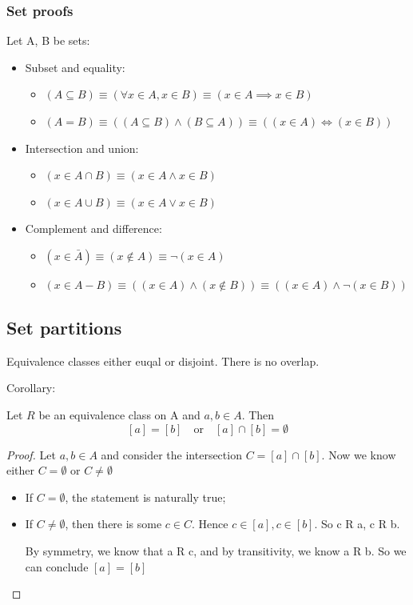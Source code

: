 \documentclass[letterpaper,12pt]{article}
\begin{document}
\subsubsection{Set proofs}
Let A, B be sets:
\begin{itemize}
    \item Subset and equality:
    \begin{itemize}
        \item $(A\subseteq B) \equiv (\forall x \in A, x\in B)\equiv (x\in A \implies x\in B)$
        \item $(A=B) \equiv ((A\subseteq B) \land (B\subseteq A))\equiv ((x\in A)\iff (x\in B))$
    \end{itemize}
    \item Intersection and union:
    \begin{itemize}
        \item $(x\in A\cap B)\equiv (x\in A \land x \in B)$
        \item $(x\in A\cup B)\equiv (x\in A \lor x \in B)$
    \end{itemize}
    \item Complement and difference:
    \begin{itemize}
        \item $(x\in \bar{A})\equiv (x\not \in A) \equiv \neg (x\in A)$
        \item $(x\in A - B)\equiv ((x\in A )\land (x\notin B))\equiv ((x\in A)\land \neg (x\in B))$
    \end{itemize}
\end{itemize}



\subsection{Set partitions}

Equivalence classes either euqal or disjoint. There is no overlap.

Corollary:

Let $R$ be an equivalence class on A and $a, b\in A$. Then 
\[[a]=[b]\quad \text{or} \quad [a]\cap[b]=\emptyset\]

\begin{proof}
    Let $a,b \in A$ and consider the intersection $C=[a]\cap[b]$. Now we know either $C=\emptyset$ or $C\neq \emptyset$
    \begin{itemize}
        \item If $ C = \emptyset$, the statement is naturally true;
        \item If $C \neq \emptyset$, then there is some $c\in C$. Hence $c\in [a],c\in[b]$. So c R a, c R b.
        
        By symmetry, we know that a R c, and by transitivity, we know a R b. So we can conclude $[a]=[b]$
    \end{itemize}
\end{proof}
\end{document}
